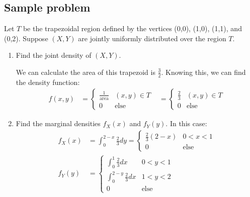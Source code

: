 \documentclass[titlepage, 12pt, leqno]{article}
\begin{document}
\subsection{Sample problem}
Let $T$ be the trapezoidal region defined by the vertices (0,0), (1,0), (1,1), 
and (0,2). Suppose $(X,Y)$ are jointly uniformly distributed over the region $T$.

\begin{enumerate}
    \item Find the joint density of $(X,Y)$.
        \vspace{10px}
        
        We can calculate the area of this trapezoid is $\frac{3}{2}$. Knowing 
        this, we can find the density function:
       \begin{align*}
           f(x,y) &= 
           \begin{cases}
               \frac{1}{ \text{area}} & (x,y) \in T \\
               0 & \text{else}
           \end{cases}
                  &=
                  \begin{cases}
                      \frac{2}{3} & (x,y) \in T \\
                      0 & \text{else}
                  \end{cases}
       \end{align*}
    \item Find the marginal densities $f_X(x)$ and $f_Y(y)$. In this case:
       \begin{align*}
           f_X(x) &= \int_{0}^{2-x}\frac{2}{3}dy =
           \begin{cases}
               \frac{2}{3}(2-x) & 0<x<1\\
               0 & \text{else}
           \end{cases} \\
           f_Y(y) &=
           \begin{cases}
               \int_{0}^{1}\frac{2}{3}dx & 0<y<1\\
               \int_{0}^{2-y}\frac{2}{3}dx & 1<y<2 \\
               0 & \text{else}
           \end{cases}
       \end{align*}
\end{enumerate}
\end{document}
